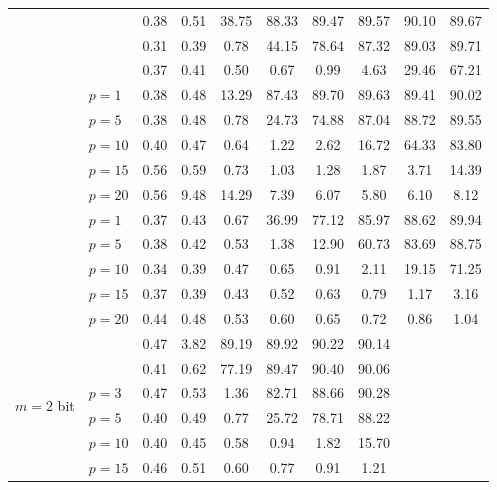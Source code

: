 \begin{table}
\begin{tabular}{| c | l | c | c | c | c | c | c | c | c |}
		& \Clipping[$0.1$] & 0.38 & 0.51 & 38.75 & 88.33 & 89.47 & 89.57 & 90.10 & 89.67\\
		& \Clipping[$0.05$] & 0.31 & 0.39 & 0.78 & 44.15 & 78.64 & 87.32 & 89.03 & 89.71\\
		& \Clipping[$0.025$] & 0.37 & 0.41 & 0.50 & 0.67 & 0.99 & 4.63 & 29.46 & 67.21\\
		\cline{2-10}
		& \Random[$0.1$] $p{=}1$ & 0.38 & 0.48 & 13.29 & 87.43 & 89.70 & 89.63 & 89.41 & 90.02\\
		& \Random[$0.1$] $p{=}5$ & 0.38 & 0.48 & 0.78 & 24.73 & 74.88 & 87.04 & 88.72 & 89.55\\
		& \Random[$0.1$] $p{=}10$ & 0.40 & 0.47 & 0.64 & 1.22 & 2.62 & 16.72 & 64.33 & 83.80\\
		& \Random[$0.1$] $p{=}15$ & 0.56 & 0.59 & 0.73 & 1.03 & 1.28 & 1.87 & 3.71 & 14.39\\
		& \Random[$0.1$] $p{=}20$ & 0.56 & 9.48 & 14.29 & 7.39 & 6.07 & 5.80 & 6.10 & 8.12\\
		& \Random[$0.05$] $p{=}1$ & 0.37 & 0.43 & 0.67 & 36.99 & 77.12 & 85.97 & 88.62 & 89.94\\
		& \Random[$0.05$] $p{=}5$ & 0.38 & 0.42 & 0.53 & 1.38 & 12.90 & 60.73 & 83.69 & 88.75\\
		& \Random[$0.05$] $p{=}10$ & 0.34 & 0.39 & 0.47 & 0.65 & 0.91 & 2.11 & 19.15 & 71.25\\
		& \Random[$0.05$] $p{=}15$ & 0.37 & 0.39 & 0.43 & 0.52 & 0.63 & 0.79 & 1.17 & 3.16\\
		& \Random[$0.05$] $p{=}20$ & 0.44 & 0.48 & 0.53 & 0.60 & 0.65 & 0.72 & 0.86 & 1.04\\
		\hline
		\hline
		\multirow{6}{*}{$m = 2$ bit} & \Clipping[$0.1$] & 0.47 & 3.82 & 89.19 & 89.92 & 90.22 & 90.14 & \multicolumn{2}{c}{\hphantom{c}}\\
		& \Clipping[$0.05$] & 0.41 & 0.62 & 77.19 & 89.47 & 90.40 & 90.06 & \multicolumn{2}{c}{\hphantom{c}}\\
		\cline{2-8}
		& \Random[$0.05$] $p{=}3$ & 0.47 & 0.53 & 1.36 & 82.71 & 88.66 & 90.28 & \multicolumn{2}{c}{\hphantom{c}}\\
		& \Random[$0.05$] $p{=}5$ & 0.40 & 0.49 & 0.77 & 25.72 & 78.71 & 88.22 & \multicolumn{2}{c}{\hphantom{c}}\\
		& \Random[$0.05$] $p{=}10$ & 0.40 & 0.45 & 0.58 & 0.94 & 1.82 & 15.70 & \multicolumn{2}{c}{\hphantom{c}}\\
		& \Random[$0.05$] $p{=}15$ & 0.46 & 0.51 & 0.60 & 0.77 & 0.91 & 1.21 & \multicolumn{2}{c}{\hphantom{c}}\\
		\cline{1-8}
	\end{tabular}
\end{table}